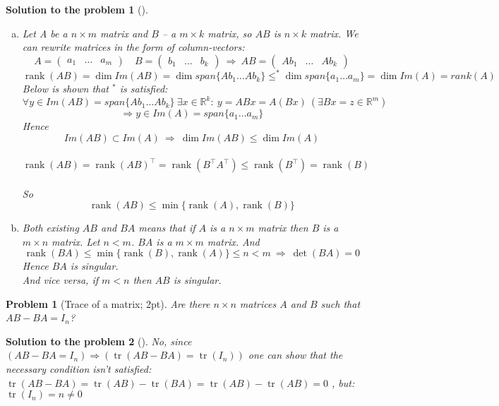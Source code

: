 \documentclass[12pt,a4]{article}
\newtheorem{problem}{Problem}
\newtheorem{solution}{Solution to the problem}
\newcommand\rank{\operatorname{rank}}
\newcommand{\trace}{\operatorname{tr}}
\begin{document}
\begin{solution}[]\rm
\begin{enumerate}[(a)]
\item
Let A be a $n\times m$ matrix and $B$ -- a $m\times k$ matrix, so $AB$ is $n\times k$ matrix. We can rewrite matrices in the form of column-vectors:
\[
A = \begin{pmatrix} a_1 & \dots & a_m\end{pmatrix}
\quad
B = \begin{pmatrix} b_1 & \dots & b_k\end{pmatrix}
~\Rightarrow~
AB = \begin{pmatrix} Ab_1 & \dots & Ab_k\end{pmatrix}
\]
\[
\rank(AB) = \dim Im (AB) = \dim span \{Ab_1 \dots Ab_k\} \leq^*  \dim span \{a_1 \dots a_m\} = \dim Im (A) = rank (A)
\]
Below is shown that $^*$ is satisfied:
\[
\forall y \in Im (AB) = span \{Ab_1 \dots Ab_k\}~\exists x \in \mathbb{R}^k:~y = ABx = A(Bx)~\left(\exists Bx=z \in \mathbb{R}^m\right)
\]
\[
\Rightarrow y \in Im (A) = span \{a_1 \dots a_m\}
\]
Hence
\[
Im (AB) \subset Im(A) ~\Rightarrow~\dim Im (AB) \leq \dim Im(A)
\]\\[5pt]
\[
\rank(AB) = \rank(AB)^\top =\rank(B^\top A^\top) \leq \rank(B^\top) = \rank(B)
\]\\[5pt]
So
\[
\rank(AB) \leq \min\{\rank(A), \rank(B)\}
\]
\item Both existing $AB$ and $BA$ means that if $A$ is a $n\times m$ matrix then $B$ is a $m\times n$ matrix. Let $n<m$. $BA$ is a $m\times m$ matrix. And
\[
\rank(BA) \leq \min\{\rank(B), \rank(A)\} \leq n<m~\Rightarrow~\det(BA) = 0
\]
Hence $BA$ is singular.\\
And vice versa, if $m<n$ then $AB$ is singular.
\\
\end{enumerate}
\end{solution}


\begin{problem}[Trace of a matrix; 2pt]\rm
	Are there $n\times n$ matrices $A$ and $B$ such that $AB-BA = I_n$? 
\end{problem}	


\begin{solution}[]\rm
No, since $\left(AB-BA = I_n \right)\Rightarrow \left(\trace(AB-BA) = \trace(I_n)\right)$ one can show that the necessary condition isn't satisfied: \\
$
\trace(AB-BA)=\trace(AB)-\trace(BA)=\trace(AB)-\trace(AB)=0
$
, but:
$
\trace(I_n)=n \neq 0
$
\\\end{solution}
\end{document}
